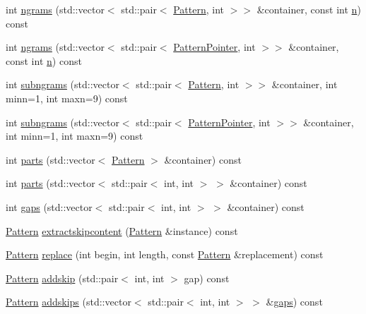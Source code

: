 \begin{DoxyCompactItemize}
\item 
int \hyperlink{classPattern_ad0d0f54adcf6e23070e6761fa1832d3c}{ngrams} (std\+::vector$<$ std\+::pair$<$ \hyperlink{classPattern}{Pattern}, int $>$$>$ \&container, const int \hyperlink{classPattern_a13e66bbb8dd77219255ade5aa5f72c7c}{n}) const 
\item 
int \hyperlink{classPattern_a85c317920a643e765fc51f6f14e2a474}{ngrams} (std\+::vector$<$ std\+::pair$<$ \hyperlink{classPatternPointer}{Pattern\+Pointer}, int $>$$>$ \&container, const int \hyperlink{classPattern_a13e66bbb8dd77219255ade5aa5f72c7c}{n}) const 
\item 
int \hyperlink{classPattern_af74f62b5d7cb9b831025340ff7b62ea4}{subngrams} (std\+::vector$<$ std\+::pair$<$ \hyperlink{classPattern}{Pattern}, int $>$$>$ \&container, int minn=1, int maxn=9) const 
\item 
int \hyperlink{classPattern_af64bc5357eb5c30128e0a4f13243cd2a}{subngrams} (std\+::vector$<$ std\+::pair$<$ \hyperlink{classPatternPointer}{Pattern\+Pointer}, int $>$$>$ \&container, int minn=1, int maxn=9) const 
\item 
int \hyperlink{classPattern_a615d0bd0b135804c993ce0fb027c5491}{parts} (std\+::vector$<$ \hyperlink{classPattern}{Pattern} $>$ \&container) const 
\item 
int \hyperlink{classPattern_acde3a00e476df661b46cc28318e32077}{parts} (std\+::vector$<$ std\+::pair$<$ int, int $>$ $>$ \&container) const 
\item 
int \hyperlink{classPattern_ad4dd286b352c7e5e66dd73233b0d6b29}{gaps} (std\+::vector$<$ std\+::pair$<$ int, int $>$ $>$ \&container) const 
\item 
\hyperlink{classPattern}{Pattern} \hyperlink{classPattern_af8d6a22c49da3a8aa470635bb67ece60}{extractskipcontent} (\hyperlink{classPattern}{Pattern} \&instance) const 
\item 
\hyperlink{classPattern}{Pattern} \hyperlink{classPattern_afab002bc06207214e84ff324becfe224}{replace} (int begin, int length, const \hyperlink{classPattern}{Pattern} \&replacement) const 
\item 
\hyperlink{classPattern}{Pattern} \hyperlink{classPattern_a0f697977abd217fe4e57a4016c3bb9e0}{addskip} (std\+::pair$<$ int, int $>$ gap) const 
\item 
\hyperlink{classPattern}{Pattern} \hyperlink{classPattern_a4a93ba100dfde6f2f0a2914bce400ed0}{addskips} (std\+::vector$<$ std\+::pair$<$ int, int $>$ $>$ \&\hyperlink{classPattern_ad4dd286b352c7e5e66dd73233b0d6b29}{gaps}) const 
\item 

\end{DoxyCompactItemize}
